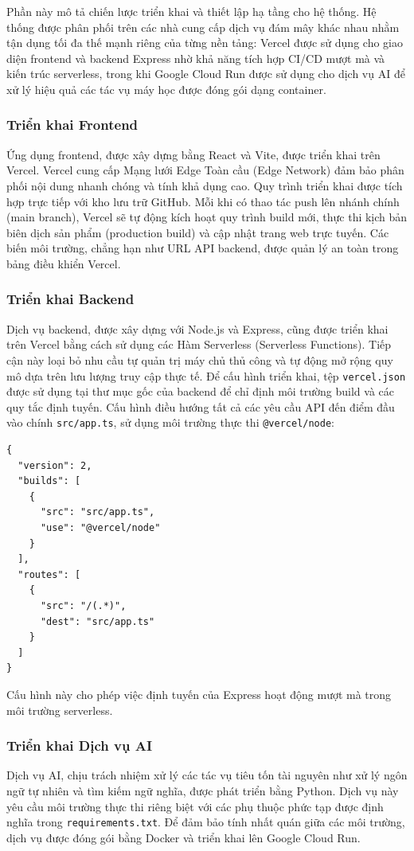 Phần này mô tả chiến lược triển khai và thiết lập hạ tầng cho hệ thống. Hệ thống được phân phối trên các nhà cung cấp dịch vụ đám mây khác nhau nhằm tận dụng tối đa thế mạnh riêng của từng nền tảng: Vercel được sử dụng cho giao diện frontend và backend Express nhờ khả năng tích hợp CI/CD mượt mà và kiến trúc serverless, trong khi Google Cloud Run được sử dụng cho dịch vụ AI để xử lý hiệu quả các tác vụ máy học được đóng gói dạng container.

\subsubsection{Triển khai Frontend}
Ứng dụng frontend, được xây dựng bằng React và Vite, được triển khai trên Vercel. Vercel cung cấp Mạng lưới Edge Toàn cầu (Edge Network) đảm bảo phân phối nội dung nhanh chóng và tính khả dụng cao. Quy trình triển khai được tích hợp trực tiếp với kho lưu trữ GitHub. Mỗi khi có thao tác push lên nhánh chính (main branch), Vercel sẽ tự động kích hoạt quy trình build mới, thực thi kịch bản biên dịch sản phẩm (production build) và cập nhật trang web trực tuyến. Các biến môi trường, chẳng hạn như URL API backend, được quản lý an toàn trong bảng điều khiển Vercel.

\subsubsection{Triển khai Backend}
Dịch vụ backend, được xây dựng với Node.js và Express, cũng được triển khai trên Vercel bằng cách sử dụng các Hàm Serverless (Serverless Functions). Tiếp cận này loại bỏ nhu cầu tự quản trị máy chủ thủ công và tự động mở rộng quy mô dựa trên lưu lượng truy cập thực tế.
Để cấu hình triển khai, tệp \texttt{vercel.json} được sử dụng tại thư mục gốc của backend để chỉ định môi trường build và các quy tắc định tuyến. Cấu hình điều hướng tất cả các yêu cầu API đến điểm đầu vào chính \texttt{src/app.ts}, sử dụng môi trường thực thi \texttt{@vercel/node}:

\begin{verbatim}
{
  "version": 2,
  "builds": [
    {
      "src": "src/app.ts",
      "use": "@vercel/node"
    }
  ],
  "routes": [
    {
      "src": "/(.*)",
      "dest": "src/app.ts"
    }
  ]
}
\end{verbatim}
Cấu hình này cho phép việc định tuyến của Express hoạt động mượt mà trong môi trường serverless.

\subsubsection{Triển khai Dịch vụ AI}
Dịch vụ AI, chịu trách nhiệm xử lý các tác vụ tiêu tốn tài nguyên như xử lý ngôn ngữ tự nhiên và tìm kiếm ngữ nghĩa, được phát triển bằng Python. Dịch vụ này yêu cầu môi trường thực thi riêng biệt với các phụ thuộc phức tạp được định nghĩa trong \texttt{requirements.txt}. Để đảm bảo tính nhất quán giữa các môi trường, dịch vụ được đóng gói bằng Docker và triển khai lên Google Cloud Run.

